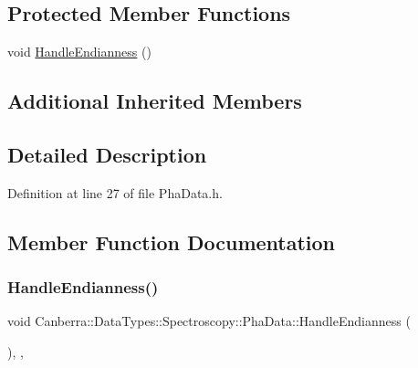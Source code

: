\subsection*{Protected Member Functions}
\begin{DoxyCompactItemize}
\item 
void \hyperlink{class_canberra_1_1_data_types_1_1_spectroscopy_1_1_pha_data_a963a64048e3633af0a249054ce2c367f_a963a64048e3633af0a249054ce2c367f}{Handle\+Endianness} ()
\end{DoxyCompactItemize}
\subsection*{Additional Inherited Members}


\subsection{Detailed Description}


Definition at line 27 of file Pha\+Data.\+h.



\subsection{Member Function Documentation}
\mbox{\label{class_canberra_1_1_data_types_1_1_spectroscopy_1_1_pha_data_a963a64048e3633af0a249054ce2c367f_a963a64048e3633af0a249054ce2c367f}} 
\subsubsection{\texorpdfstring{Handle\+Endianness()}{HandleEndianness()}}
{\footnotesize\ttfamily void Canberra\+::\+Data\+Types\+::\+Spectroscopy\+::\+Pha\+Data\+::\+Handle\+Endianness (\begin{DoxyParamCaption}{ }\end{DoxyParamCaption})\hspace{0.3cm}{\ttfamily [inline]}, {\ttfamily [protected]}, {\ttfamily [virtual]}}

